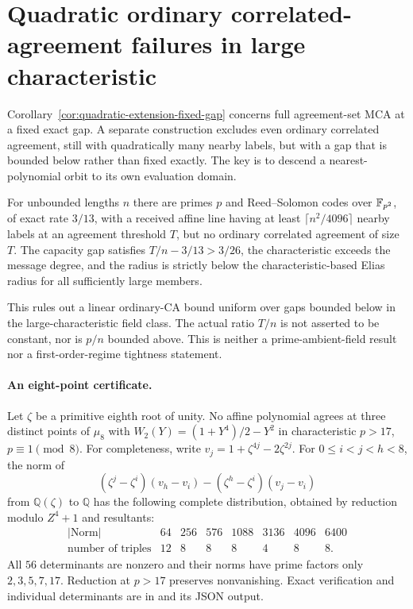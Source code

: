 \section{Quadratic ordinary correlated-agreement failures in large characteristic}
\label{app:ordinary-ca-superlinear}

Corollary~\ref{cor:quadratic-extension-fixed-gap} concerns full agreement-set
MCA at a fixed exact gap. A separate construction excludes even ordinary
correlated agreement, still with quadratically many nearby labels, but
with a gap that is bounded below rather than fixed exactly. The key is
to descend a nearest-polynomial orbit to its own evaluation domain.

\begin{theorem}\label{thm:ordinary-ca-superlinear}
For unbounded lengths $n$ there are primes $p$ and Reed--Solomon codes
over $\mathbb F_{p^2}$, of exact rate $3/13$, with a received affine line having
at least $\lceil n^2/4096\rceil$ nearby labels at an agreement threshold
$T$, but no ordinary correlated agreement of size $T$.
The capacity gap satisfies $T/n-3/13>3/26$, the characteristic exceeds
the message degree, and the radius is strictly below the
characteristic-based Elias radius for all sufficiently large members.
\end{theorem}

This rules out a linear ordinary-CA bound uniform over gaps bounded below
in the large-characteristic field class. The actual ratio $T/n$ is not
asserted to be constant, nor is $p/n$ bounded above. This is neither a
prime-ambient-field result nor a first-order-regime tightness statement.

\paragraph{An eight-point certificate.}
Let $\zeta$ be a primitive eighth root of unity. No affine polynomial
agrees at three distinct points of $\mu_8$ with
$W_2(Y)=(1+Y^4)/2-Y^2$ in characteristic $p>17$, $p\equiv1\pmod8$.
For completeness, write $v_j=1+\zeta^{4j}-2\zeta^{2j}$. For
$0\le i<j<h<8$, the norm of
\[
 (\zeta^j-\zeta^i)(v_h-v_i)
 -(\zeta^h-\zeta^i)(v_j-v_i)
\]
from $\mathbb Q(\zeta)$ to $\mathbb Q$ has the following complete
distribution, obtained by reduction modulo $Z^4+1$ and resultants:
\[
\begin{array}{c|rrrrrrr}
 |\mathrm{Norm}|&64&256&576&1088&3136&4096&6400\\\hline
 \text{number of triples}&12&8&8&8&4&8&8.
\end{array}
\]
All $56$ determinants are nonzero and their norms have prime factors only
$2,3,5,7,17$. Reduction at $p>17$ preserves nonvanishing. Exact verification
and individual determinants are in
 and its JSON output.

